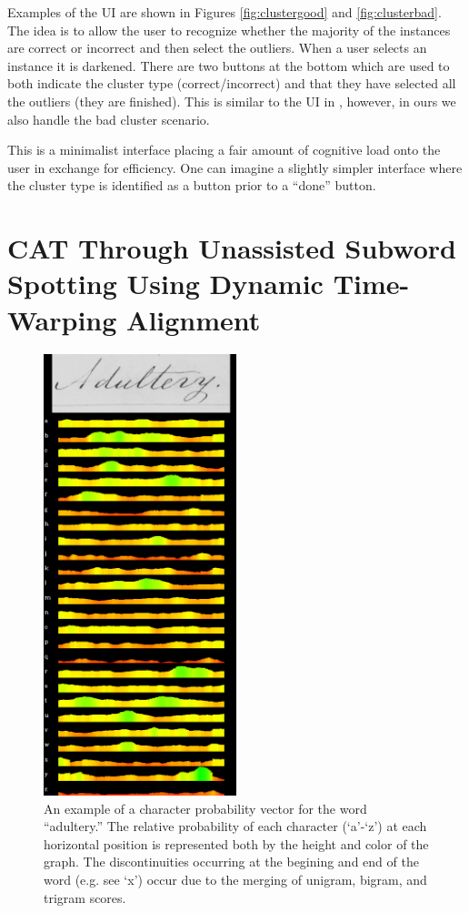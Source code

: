 \documentclass[ms,electronic,twosidetoc,letterpaper,chaptercenter,parttop,lof,lot]{byumsphd}
\begin{document}
Examples of the UI are shown in Figures \ref{fig:clustergood} and \ref{fig:clusterbad}. The idea is to allow the user to recognize whether the majority of the instances are correct or incorrect and then select the outliers. When a user selects an instance it is darkened. There are two buttons at the bottom which are used to both indicate the cluster type (correct/incorrect) and that they have selected all the outliers (they are finished). This is similar to the UI in \cite{Clawson2014}, however, in ours we also handle the bad cluster scenario.

This is a minimalist interface placing a fair amount of cognitive load onto the user in exchange for efficiency. One can imagine a slightly simpler interface where the cluster type is identified as a button prior to a ``done'' button.



\section{CAT Through Unassisted Subword Spotting Using Dynamic Time-Warping Alignment} %

\begin{figure}
    \centering
    \includegraphics[width=0.5\textwidth]{cpv}
    \caption{An example of a character probability vector for the word ``adultery.'' The relative probability of each character (`a'-`z') at each horizontal position is represented both by the height and color of the graph. The discontinuities occurring at the begining and end of the word (e.g. see `x') occur due to the merging of unigram, bigram, and trigram scores.}
    \label{fig:cpv}
\end{figure}
\end{document}
